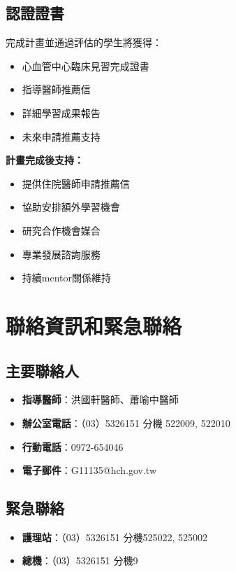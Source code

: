 \documentclass[12pt,a4paper]{article}
\begin{document}
\subsection{認證證書}
完成計畫並通過評估的學生將獲得：
\begin{itemize}[nosep]
    \item 心血管中心臨床見習完成證書
    \item 指導醫師推薦信
    \item 詳細學習成果報告
    \item 未來申請推薦支持
\end{itemize}

\begin{importantbox}
\textbf{計畫完成後支持：}
\begin{itemize}[nosep]
\item 提供住院醫師申請推薦信
\item 協助安排額外學習機會
\item 研究合作機會媒合
\item 專業發展諮詢服務
\item 持續mentor關係維持
\end{itemize}
\end{importantbox}

\section{聯絡資訊和緊急聯絡}

\subsection{主要聯絡人}
\begin{itemize}[nosep]
    \item \textbf{指導醫師}：洪國軒醫師、蕭喻中醫師
    \item \textbf{辦公室電話}：（03）5326151 分機 522009, 522010
    \item \textbf{行動電話}：0972-654046
    \item \textbf{電子郵件}：G11135@hch.gov.tw
\end{itemize}

\subsection{緊急聯絡}
\begin{itemize}[nosep]
    \item \textbf{護理站}：（03）5326151 分機525022, 525002
    \item \textbf{總機}：（03）5326151 分機9
\end{itemize}
\end{document}
